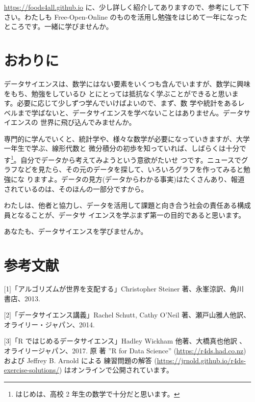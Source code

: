 \documentclass[
]{book}
\theoremstyle{definition}
\theoremstyle{definition}
\theoremstyle{definition}
\theoremstyle{definition}
\theoremstyle{remark}
\begin{document}
\url{https://foods4all.github.io} に、少し詳しく紹介してありますので、参考にして下さい。わたしも Free-Open-Online のものを活用し勉強をはじめて一年になったところです。一緒に学びませんか。

\hypertarget{ux304aux308fux308aux306b-1}{%
\section{おわりに}\label{ux304aux308fux308aux306b-1}}

データサイエンスは、数学にはない要素をいくつも含んでいますが、数学に興味をもち、勉強をしているひ とにとっては抵抗なく学ぶことができると思います。必要に応じて少しずつ学んでいけばよいので、まず、数 学や統計をあるレベルまで学ばないと、データサイエンスを学べないことはありません。データサイエンスの 世界に飛び込んでみませんか。

専門的に学んでいくと、統計学や、様々な数学が必要になっていきますが、大学一年生で学ぶ、線形代数と 微分積分の初歩を知っていれば、しばらくは十分です\footnote{はじめは、高校 2 年生の数学で十分だと思います。}。自分でデータから考えてみようという意欲がたいせ つです。ニュースでグラフなどを見たら、その元のデータを探して、いろいろグラフを作ってみると勉強にな りますよ。データの見方(データからわかる事実)はたくさんあり、報道されているのは、そのほんの一部分ですから。

わたしは、他者と協力し、データを活用して課題と向き合う社会の責任ある構成員となることが、データサ イエンスを学ぶまず第一の目的であると思います。

あなたも、データサイエンスを学びませんか。

\hypertarget{ux53c2ux8003ux6587ux732e}{%
\section*{参考文献}\label{ux53c2ux8003ux6587ux732e}}

{[}1{]}「アルゴリズムが世界を支配する」Christopher Steiner 著、永峯涼訳、角川 書店、2013.

{[}2{]}「データサイエンス講義」Rachel Schutt, Cathy O'Neil 著、瀬戸山雅人他訳、オライリー・ジャパン、2014.

{[}3{]}「R ではじめるデータサイエンス」Hadley Wickham 他著、大橋真也他訳 、オライリージャパン、2017. 原
著 ''R for Data Science'' (\url{https://r4ds.had.co.nz}) および Jeffrey B. Arnold による 練習問題の解答
(\url{https://jrnold.github.io/r4ds-exercise-solutions/}) はオンラインで公開されています。
\end{document}
